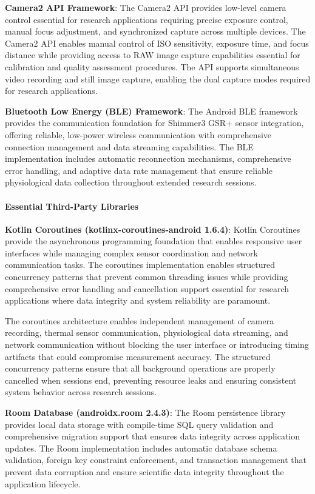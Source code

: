 \documentclass[11pt,a4paper]{article}
\begin{document}
\textbf{Camera2 API Framework}: The Camera2 API provides low-level camera control essential for research applications
requiring precise exposure control, manual focus adjustment, and synchronized capture across multiple devices. The
Camera2 API enables manual control of ISO sensitivity, exposure time, and focus distance while providing access to RAW
image capture capabilities essential for calibration and quality assessment procedures. The API supports simultaneous
video recording and still image capture, enabling the dual capture modes required for research applications.

\textbf{Bluetooth Low Energy (BLE) Framework}: The Android BLE framework provides the communication foundation for Shimmer3
GSR+ sensor integration, offering reliable, low-power wireless communication with comprehensive connection management
and data streaming capabilities. The BLE implementation includes automatic reconnection mechanisms, comprehensive error
handling, and adaptive data rate management that ensure reliable physiological data collection throughout extended
research sessions.

\paragraph{Essential Third-Party Libraries}

\textbf{Kotlin Coroutines (kotlinx-coroutines-android 1.6.4)}: Kotlin Coroutines provide the asynchronous programming
foundation that enables responsive user interfaces while managing complex sensor coordination and network communication
tasks. The coroutines implementation enables structured concurrency patterns that prevent common threading issues while
providing comprehensive error handling and cancellation support essential for research applications where data integrity
and system reliability are paramount.

The coroutines architecture enables independent management of camera recording, thermal sensor communication,
physiological data streaming, and network communication without blocking the user interface or introducing timing
artifacts that could compromise measurement accuracy. The structured concurrency patterns ensure that all background
operations are properly cancelled when sessions end, preventing resource leaks and ensuring consistent system behavior
across research sessions.

\textbf{Room Database (androidx.room 2.4.3)}: The Room persistence library provides local data storage with compile-time SQL
query validation and comprehensive migration support that ensures data integrity across application updates. The Room
implementation includes automatic database schema validation, foreign key constraint enforcement, and transaction
management that prevent data corruption and ensure scientific data integrity throughout the application lifecycle.
\end{document}
